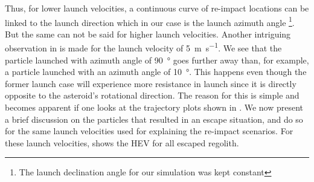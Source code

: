 \FloatBarrier
Thus, for lower launch velocities, a continuous curve of re-impact locations can be linked to the launch direction which in our case is the launch azimuth angle \footnote{The launch declination angle for our simulation was kept constant}. But the same can not be said for higher launch velocities. Another intriguing observation in  is made for the launch velocity of \SI{5}{\metre\per\second}. We see that the particle launched with azimuth angle of \SI{90}{\degree} goes further away than, for example, a particle launched with an azimuth angle of \SI{10}{\degree}. This happens even though the former launch case will experience more resistance in launch since it is directly opposite to the asteroid's rotational direction. The reason for this is simple and becomes apparent if one looks at the trajectory plots shown in .
%
\newline\newline
%
We now present a brief discussion on the particles that resulted in an escape situation, and do so for the same launch velocities used for explaining the re-impact scenarios. For these launch velocities,  shows the \gls{HEV} for all escaped regolith.
